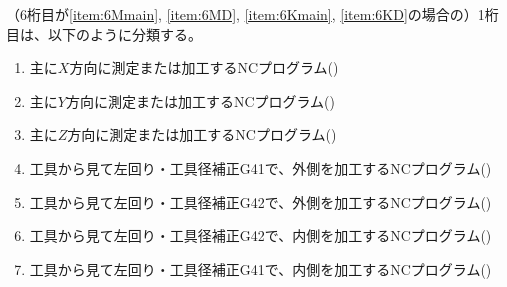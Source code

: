 \clearpage
（6桁目が\ref{item:6Mmain}, \ref{item:6MD}, \ref{item:6Kmain}, \ref{item:6KD}\hx の場合の）1桁目は、以下のように分類する。
\begin{enumerate}[label=\arabic*.]
\item 主に$X$方向に測定または加工するNCプログラム({})
\item 主に$Y$方向に測定または加工するNCプログラム({})
\item 主に$Z$方向に測定または加工するNCプログラム({})
\item 工具から見て左回り・工具径補正{\ttfamily G41}で、外側を加工するNCプログラム({})
\item 工具から見て左回り・工具径補正{\ttfamily G42}で、外側を加工するNCプログラム({})
\item 工具から見て左回り・工具径補正{\ttfamily G42}で、内側を加工するNCプログラム({})
\item 工具から見て左回り・工具径補正{\ttfamily G41}で、内側を加工するNCプログラム({})
\end{enumerate}
